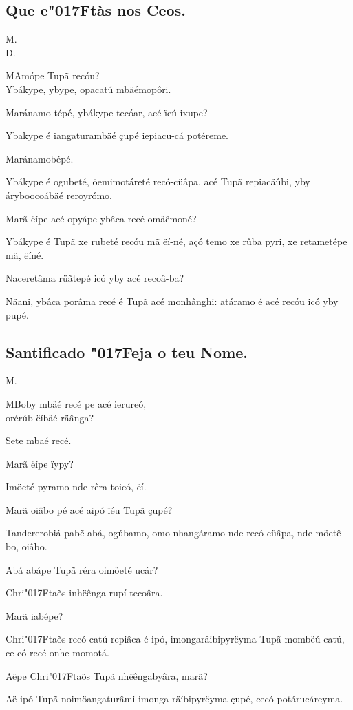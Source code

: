 \documentclass[openany,titlepage,12pt]{book}
\newcommand{\lgS}{\char"017F}
\newcommand{\comecalista}[5]{
    \hspace*{-11.7pt}
    \begin{minipage}[t]{0.08\linewidth}
        \flushright #1\\#2
    \end{minipage}
    \hspace{0pt}
    \begin{minipage}[t]{0.94\linewidth}
        \lettrine
        [findent =2pt, nindent=0pt,  lines=2]
        {#3}{#4}#5
    \end{minipage}
    \vspace*{-3pt}
}
\begin{document}
\subsection{Que e\lgS tàs nos Ceos.}
\unskip\vspace*{-0.7\baselineskip}
\comecalista{M.}{D.}{M}{A}
    {mópe Tupã recóu?\\
    Ybákype, ybype, opacatú mbäé\linebreak mopôri.}
\begin{alternate}
    \item Maránamo tépé, ybákype tecóar, acé ïeú ixupe?
    \item Ybakype é iangaturambäé çupé iepiacu-cá potéreme.
    \item Maránamobépé.
    \item Ybákype é ogubeté, öemimotáreté recó-cüâpa, acé
    Tupã repiacäûbi, yby árybo\linebreak ocoábäé reroyrómo.
    \item Marã ëípe acé opyápe ybâca recé omäêmoné?
    \item Ybákype é Tupã xe rubeté recóu mã ëí-né, açó
    temo xe rûba pyri, xe retametépe mã, ëíné.
    \item Naceretâma rüãtepé icó yby acé recoâ-ba?
    \item Näani, ybâca porâma recé é Tupã acé\linebreak
    monhânghi: atáramo é acé recóu icó yby pupé.
\end{alternate}
\unskip\vspace*{-0.7\baselineskip}
\subsection{Santificado \lgS eja o teu Nome.}
\unskip\vspace*{-0.7\baselineskip}
\comecalista{M.}{}{M}{B}
    {oby mbäé recé pe acé ierureó,\\
    \hspace*{10pt}orérúb ëíbäé räânga?}
\begin{altereven}
    \item Sete mbaé recé.
    \item Marã ëípe ïypy?
    \item Imöeté pyramo nde rêra toicó, ëí.
    \item Marã oiâbo  pé acé aipó ïéu Tupã çupé?
    \item Tandererobiá pabẽ abá, ogúbamo, omo-nhangáramo
    nde recó cüâpa, nde möetê-bo, oiâbo.
    \item Abá abápe Tupã réra oimöeté ucár?
    \item Chri\lgS taõs inhëênga rupí tecoâra.
    \item Marã iabépe?
    \item Chri\lgS taõs recó catú repiâca é ipó, 
    imongarâibipyrëyma Tupã mombëú catú, ce-có recé 
    onhe momotá.
    \item Aëpe Chri\lgS taõs Tupã nhëêngabyâra,\linebreak
    marã? 
    \item Aë ipó Tupã noimöangaturâmi imonga-räíbipyrëyma
    çupé, cecó potárucáreyma.
\end{altereven}
\end{document}
